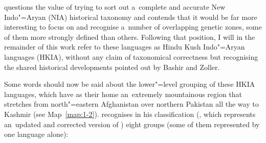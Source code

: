 \citet[460]{masica1991} questions the value of trying to sort out a~complete and accurate New Indo"=Aryan (NIA) historical taxonomy and contends that it would be far more interesting to focus on and recognise a~number of overlapping genetic zones, some of them more strongly defined than others. Following that position, I will in the remainder of this work refer to these languages as Hindu Kush Indo"=Aryan languages (HKIA), without any claim of taxonomical correctness but recognising the shared historical developments pointed out by Bashir and Zoller. 


Some words should now be said about the lower"=level grouping of these HKIA languages, which have as their home an~extremely mountainous region that stretches from north"=eastern Afghanistan over northern Pakistan all the way to Kashmir (see Map~\ref{map:1-2}). \citeauthor{strand2001} recognises in his classification (\citeyear[258]{strand2001}, which represents an~updated and corrected version of \citealt{strand1973}) eight groups (some of them represented by one language alone): 


